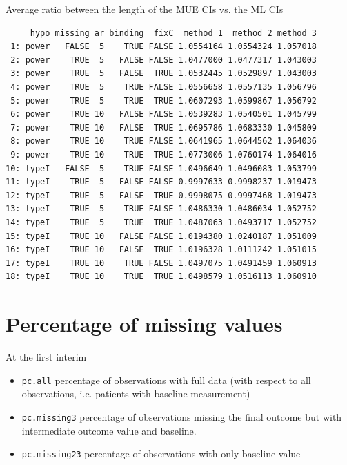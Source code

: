 \documentclass[12pt]{article}
\begin{document}
Average ratio between the length of the MUE CIs vs. the ML CIs
\begin{verbatim}
     hypo missing ar binding  fixC  method 1  method 2 method 3
 1: power   FALSE  5    TRUE FALSE 1.0554164 1.0554324 1.057018
 2: power    TRUE  5   FALSE FALSE 1.0477000 1.0477317 1.043003
 3: power    TRUE  5   FALSE  TRUE 1.0532445 1.0529897 1.043003
 4: power    TRUE  5    TRUE FALSE 1.0556658 1.0557135 1.056796
 5: power    TRUE  5    TRUE  TRUE 1.0607293 1.0599867 1.056792
 6: power    TRUE 10   FALSE FALSE 1.0539283 1.0540501 1.045799
 7: power    TRUE 10   FALSE  TRUE 1.0695786 1.0683330 1.045809
 8: power    TRUE 10    TRUE FALSE 1.0641965 1.0644562 1.064036
 9: power    TRUE 10    TRUE  TRUE 1.0773006 1.0760174 1.064016
10: typeI   FALSE  5    TRUE FALSE 1.0496649 1.0496083 1.053799
11: typeI    TRUE  5   FALSE FALSE 0.9997633 0.9998237 1.019473
12: typeI    TRUE  5   FALSE  TRUE 0.9998075 0.9997468 1.019473
13: typeI    TRUE  5    TRUE FALSE 1.0486330 1.0486034 1.052752
14: typeI    TRUE  5    TRUE  TRUE 1.0487063 1.0493717 1.052752
15: typeI    TRUE 10   FALSE FALSE 1.0194380 1.0240187 1.051009
16: typeI    TRUE 10   FALSE  TRUE 1.0196328 1.0111242 1.051015
17: typeI    TRUE 10    TRUE FALSE 1.0497075 1.0491459 1.060913
18: typeI    TRUE 10    TRUE  TRUE 1.0498579 1.0516113 1.060910
\end{verbatim}

\clearpage

\section{Percentage of missing values}
\label{sec:orgadf1d47}

At the first interim
\begin{itemize}
\item \texttt{pc.all} percentage of observations with full data (with respect to
all observations, i.e. patients with baseline measurement)
\item \texttt{pc.missing3} percentage of observations missing the final outcome
but with intermediate outcome value and baseline.
\item \texttt{pc.missing23} percentage of observations with only baseline value
\end{itemize}
\end{document}

